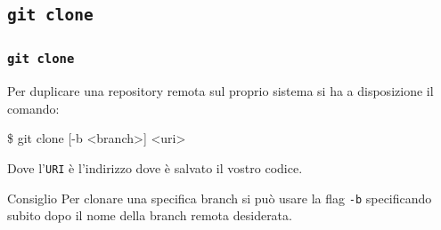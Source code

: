 \documentclass{beamer}
\begin{document}
\subsection{\texttt{git clone}}
\begin{frame}
  \frametitle{\texttt{git clone}}
  Per duplicare una repository remota sul proprio sistema si ha a disposizione
  il comando:
  \begin{semiverbatim}
  \$ git clone [-b <branch>] <uri>
  \end{semiverbatim}
  Dove l'\texttt{URI} \`e l'indirizzo dove \`e salvato il vostro codice.
  \pause
  \begin{block}{Consiglio}
    Per clonare una specifica branch si pu\`o usare la flag \texttt{-b}
    specificando subito dopo il nome della branch remota desiderata.
  \end{block}
\end{frame}
\end{document}
